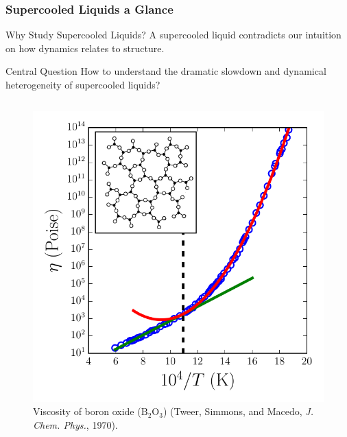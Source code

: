 \begin{frame}[c]\label{a.1}
\frametitle{Supercooled Liquids a Glance}%
\vspace{-12.0pt}
\begin{overprint}
\begin{block}{\large \centering Why Study Supercooled Liquids?}
\vspace{6pt}
\centering A supercooled liquid contradicts our intuition on how dynamics relates to structure.
\end{block}
\begin{block}{\large \centering Central Question}
\vspace{6pt}
\centering How to understand the dramatic slowdown and dynamical heterogeneity of supercooled liquids?
\end{block}
\end{overprint}
%
\begin{columns}
\begin{column}{0.5\textwidth}
\centering  {}

\begin{figure}[t]

\begin{overprint}
\centering\includegraphics[height=0.6\textheight]{intro_glassy/timerelax_b2o3_4.pdf}
\caption{Viscosity of boron oxide ($\mathrm{B_2 O_3}$) (Tweer, Simmons, and Macedo, \textit{J. Chem. Phys.},  1970).}


\end{overprint}
\end{figure}
\end{column}
\end{columns}
\end{frame}
